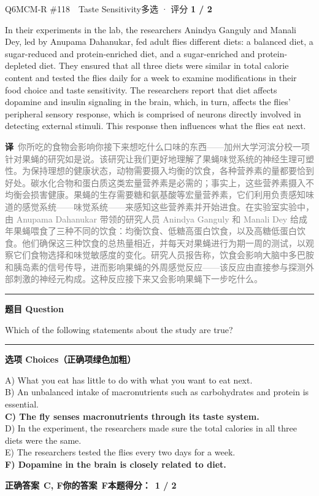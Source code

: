 \documentclass[11pt]{article}
\newcommand{\ptesub}[1]{%
  \par\needspace{2\baselineskip}\smallskip
  {\color{cAccent}\rule[-0.2ex]{3pt}{1.05em}}\hspace{6pt}%
  {\bfseries\color{cHead}#1}\par\nopagebreak\smallskip}
\newcommand{\zh}[1]{{\footnotesize\textcolor{cNote}{\textbf{译}}\ \textcolor{gray}{#1}}}
\begin{document}
\begin{qblock}{Q6\quad MCM-R \#118\ \ Taste Sensitivity}{多选 · 评分 \textcolor{cAccent}{\bfseries 1 / 2}}
\begin{promptbox}
In their experiments in the lab, the researchers Anindya Ganguly and Manali Dey, led by Anupama Dahanukar, fed adult flies different diets: a balanced diet, a sugar-reduced and protein-enriched diet, and a sugar-enriched and protein-depleted diet. They ensured that all three diets were similar in total calorie content and tested the flies daily for a week to examine modifications in their food choice and taste sensitivity. The researchers report that diet affects dopamine and insulin signaling in the brain, which, in turn, affects the flies' peripheral sensory response, which is comprised of neurons directly involved in detecting external stimuli. This response then influences what the flies eat next.
\end{promptbox}
\zh{你所吃的食物会影响你接下来想吃什么口味的东西——加州大学河滨分校一项针对果蝇的研究如是说。该研究让我们更好地理解了果蝇味觉系统的神经生理可塑性。为保持理想的健康状态，动物需要摄入均衡的饮食，各种营养素的量都要恰到好处。碳水化合物和蛋白质这类宏量营养素是必需的；事实上，这些营养素摄入不均衡会损害健康。果蝇的生存需要糖和氨基酸等宏量营养素，它们利用负责感知味道的感觉系统——味觉系统——来感知这些营养素并开始进食。在实验室实验中，由 Anupama Dahanukar 带领的研究人员 Anindya Ganguly 和 Manali Dey 给成年果蝇喂食了三种不同的饮食：均衡饮食、低糖高蛋白饮食，以及高糖低蛋白饮食。他们确保这三种饮食的总热量相近，并每天对果蝇进行为期一周的测试，以观察它们食物选择和味觉敏感度的变化。研究人员报告称，饮食会影响大脑中多巴胺和胰岛素的信号传导，进而影响果蝇的外周感觉反应——该反应由直接参与探测外部刺激的神经元构成。这种反应接下来又会影响果蝇下一步吃什么。}
\ptesub{题目 Question}
\begin{notebox}Which of the following statements about the study are true?\end{notebox}
\ptesub{选项 Choices（正确项绿色加粗）}
{\small
A) What you eat has little to do with what you want to eat next.\\
B) An unbalanced intake of macronutrients such as carbohydrates and protein is essential.\\
{\color{cFix}\textbf{C) The fly senses macronutrients through its taste system.}}\\
D) In the experiment, the researchers made sure the total calories in all three diets were the same.\\
E) The researchers tested the flies every two days for a week.\\
{\color{cFix}\textbf{F) Dopamine in the brain is closely related to diet.}}}
\par\smallskip
\textbf{正确答案}\ \textcolor{cFix}{\bfseries C, F}\qquad\textbf{你的答案}\ {\color{cWrong}\bfseries F}\qquad\textbf{本题得分：}\ {\color{cAccent}\bfseries 1 / 2}
\end{qblock}
\end{document}
